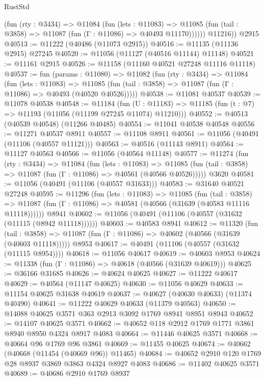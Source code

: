 \begin{lexlean}{RustStd}
\begin{coremodule}
            (fun (rty : @3434) =>
            @11084
              (fun (lets : @11083) =>
              @11085 (fun (tail : @3858) => @11087 (fun (Γ : @11086) => @40493 @11170))))))
        @11216))
    @2915
@40513 := @11222 (@40486 (@11073 @2915))
@40516 := @11135 (@11136 @2915) @27245
@40520 := @11056 (@11127 (@40516 @11144) @11148)
@40521 := @11161 @2915
@40526 := @11158 (@11160 @40521 @27248 @11116 @11118)
@40537 := fun (params : @11080) =>
  @11082
    (fun (rty : @3434) =>
    @11084
      (fun (lets : @11083) =>
      @11085 (fun (tail : @3858) => @11087 (fun (Γ : @11086) => @40493 (@40520 @40526)))))
@40538 := @11081 @40537
@40539 := @11078 @40538
@40548 := @11184
    (fun (U : @11183) => @11185 (fun (t : @7) => @11193 (@11056 (@11199 @27245 @11074) @11210)))
@40552 := @40513 (@40539 @40548) (@11266 @40485)
@40554 := @11041 @40538 @40548
@40556 := @11271 @40537 @8911
@40557 := @11108 @8911
@40561 := @11056 (@40491 (@11106 (@40557 @11121)))
@40563 := @40516 (@11143 @8911)
@40564 := @11127 @40563
@40566 := @11056 (@40564 @11148)
@40577 := @11274
    (fun (rty : @3434) =>
    @11084
      (fun (lets : @11083) =>
      @11085 (fun (tail : @3858) => @11087 (fun (Γ : @11086) => @40561 (@40566 @40526)))))
    @3620
@40581 := @11056 (@40491 (@11106 (@40557 @31633)))
@40583 := @31640 @40521 @27248
@40595 := @11296
    (fun (lets : @11083) =>
    @11085
      (fun (tail : @3858) =>
      @11087 (fun (Γ : @11086) => @40581 (@40566 (@31639 (@40583 @11116 @11118))))))
    @8941
@40602 := @11056 (@40491 (@11106 (@40557 (@31632 (@11115 (@8942 @11118))))))
@40603 := @40583 @8941
@40612 := @11320
    (fun (tail : @3858) => @11087 (fun (Γ : @11086) => @40602 (@40566 (@31639 (@40603 @11118)))))
    @8953
@40617 := @40491 (@11106 (@40557 (@31632 (@11115 @8954))))
@40618 := @11056 @40617
@40619 := @40603 @8953
@40624 := @11338 (fun (Γ : @11086) => @40618 (@40566 (@31639 @40619)))
@40625 := @36166 @31685
@40626 := @40624 @40625
@40627 := @11222 @40617
@40629 := @40564 (@11147 @40625)
@40630 := @11056 @40629
@40633 := @11154 @40625 @31638 @40619
@40637 := @40627 (@40630 @40633) (@11374 @40490)
@40641 := @11222 @40629 @40633 (@11379 @40563)
@40650 := @14088 @40625 @3571 @363 @2913 @3092 @1769 @8941 @8951 @8943
@40652 := @14107 @40625 @3571
@40662 := @40652 @118 @2912 @1769 @1771 @3861 @8940 @8950 @4324 @8917 @4083
@40664 := @11446 @40625 @3571
@40668 := @40664 @96 @1769 @96 @3861
@40669 := @11455 @40625
@40674 := @40662 (@40668 (@11454 (@40669 @96)) @11465)
@40684 := @40652 @2910 @120 @1769 @28 @8937 @3869 @3863 @4324 @8927 @4083
@40686 := @11402 @40625 @3571
@40689 := @40686 @2910 @1769 @8937

\end{coremodule}
\end{lexlean}
